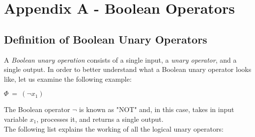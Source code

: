 \documentclass[]{usiinfbachelorproject}
\begin{document}
\newpage

\section{Appendix A - Boolean Operators}\label{sec:operators}
\subsection{Definition of Boolean Unary Operators}\label{subsubsec:definition-of-boolean-unary-operators}
A \textit{Boolean unary operation} consists of a single input, a \textit{unary operator}, and a single output. In order to better understand what a Boolean unary operator looks like, let us examine the following example:
\begin{center}
    $\Phi \ = \ (\neg x_1)$
\end{center}
The Boolean operator $\neg$ is known as "NOT" and, in this case, takes in input variable $x_1$, processes it, and returns a single output. \\
The following list explains the working of all the logical unary operators:
\end{document}

